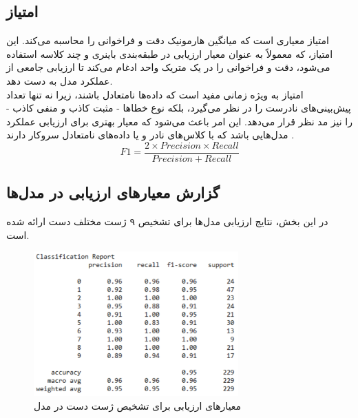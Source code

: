 \subsection{امتیاز }
امتیاز  معیاری است که میانگین هارمونیک دقت و فراخوانی را محاسبه می‌کند. این امتیاز، که معمولاً به عنوان معیار ارزیابی در طبقه‌بندی باینری و چند کلاسه استفاده می‌شود، دقت و فراخوانی را در یک متریک واحد ادغام می‌کند تا ارزیابی جامعی از عملکرد مدل به دست دهد.
\\
امتیاز  به ویژه زمانی مفید است که داده‌ها نامتعادل باشند، زیرا نه تنها تعداد پیش‌بینی‌های نادرست را در نظر می‌گیرد، بلکه نوع خطاها - مثبت کاذب و منفی کاذب - را نیز مد نظر قرار می‌دهد. این امر باعث می‌شود که  معیار بهتری برای ارزیابی عملکرد مدل‌هایی باشد که با کلاس‌های نادر و یا داده‌های نامتعادل سروکار دارند \cite{F1scorei14:online}.
\[ F1  = \frac{2 \times Precision \times Recall}{Precision + Recall} \]



\subsection{گزارش معیارهای ارزیابی در مدل‌ها}
در این بخش، نتایج ارزیابی مدل‌ها برای تشخیص ۹ ژست مختلف دست ارائه شده است.

\begin{figure}[h]
    \centering
    \includegraphics[width=0.7\textwidth]{textchart.png}
    \caption{ معیارهای ارزیابی برای تشخیص ژست دست در مدل }
\end{figure}

